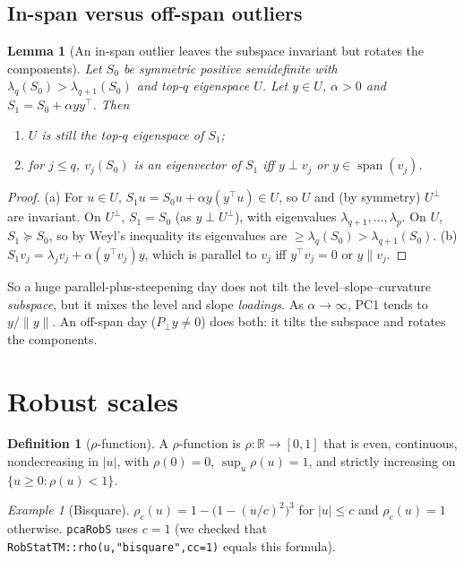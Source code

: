 \documentclass[11pt]{article}
\newtheorem{lemma}[theorem]{Lemma}
\theoremstyle{definition}
\newtheorem{definition}[theorem]{Definition}
\theoremstyle{remark}
\newtheorem{example}[theorem]{Example}
\DeclareMathOperator{\spn}{span}
\newcommand{\R}{\mathbb{R}}
\newcommand{\norm}[1]{\lVert #1\rVert}
\newcommand{\Pp}{P_{\!\perp}}
\begin{document}
\subsection{In-span versus off-span outliers}

\begin{lemma}[An in-span outlier leaves the subspace invariant but rotates the components]\label{lem:inspan}
Let $S_0$ be symmetric positive semidefinite with $\lambda_q(S_0)>\lambda_{q+1}(S_0)$ and top-$q$ eigenspace $U$.
Let $y\in U$, $\alpha>0$ and $S_1=S_0+\alpha yy^\top$. Then
\begin{enumerate}[label=(\alph*)]
\item $U$ is still the top-$q$ eigenspace of $S_1$;
\item for $j\le q$, $v_j(S_0)$ is an eigenvector of $S_1$ iff $y\perp v_j$ or $y\in\spn(v_j)$.
\end{enumerate}
\end{lemma}
\begin{proof}
(a) For $u\in U$, $S_1u=S_0u+\alpha y(y^\top u)\in U$, so $U$ and (by symmetry) $U^\perp$ are invariant.
On $U^\perp$, $S_1=S_0$ (as $y\perp U^\perp$), with eigenvalues $\lambda_{q+1},\dots,\lambda_p$.
On $U$, $S_1\succeq S_0$, so by Weyl's inequality its eigenvalues are $\ge\lambda_q(S_0)>\lambda_{q+1}(S_0)$.
(b) $S_1v_j=\lambda_jv_j+\alpha(y^\top v_j)y$, which is parallel to $v_j$ iff $y^\top v_j=0$ or $y\parallel v_j$.
\end{proof}

So a huge parallel-plus-steepening day does not tilt the level--slope--curvature
\emph{subspace}, but it mixes the level and slope \emph{loadings}. As $\alpha\to\infty$, PC1 tends to $y/\norm{y}$.
An off-span day ($\Pp y\ne0$) does both: it tilts the subspace and rotates the components.

\section{Robust scales}\label{sec:mscale}

\begin{definition}[$\rho$-function]\label{def:rho}
A $\rho$-function is $\rho:\R\to[0,1]$ that is even, continuous, nondecreasing in $|u|$, with $\rho(0)=0$,
$\sup_u\rho(u)=1$, and strictly increasing on $\{u\ge0:\rho(u)<1\}$.
\end{definition}

\begin{example}[Bisquare]\label{ex:bisq}
$\rho_c(u)=1-\bigl(1-(u/c)^2\bigr)^3$ for $|u|\le c$ and $\rho_c(u)=1$ otherwise.
\texttt{pcaRobS} uses $c=1$ (we checked that \texttt{RobStatTM::rho(u,"bisquare",cc=1)} equals this formula).
\end{example}
\end{document}
